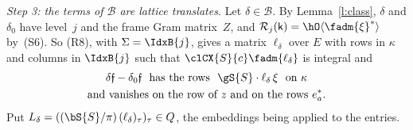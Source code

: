 \documentclass[11pt,a4paper]{article}
\makeatletter
\newcommand{\m}[1]{\mbox{$#1$}}        %
\theoremstyle{plainx}
\theoremstyle{uprightx}
\renewenvironment{proof}[1][Proof]{\par\pushQED{\qed}\normalfont\topsep0pt\partopsep0pt
  \trivlist\item[\hskip\labelsep\itshape #1.]\ignorespaces}{\popQED\endtrivlist\@endpefalse}
\renewcommand{\m}[1]{$#1$}
\newcommand{\bb}{\bS{S}}
\newcommand{\gq}{\gS{S}}
\newcommand{\inp}[1]{\textup{(#1)}}
\makeatother
\begin{document}
\begin{proof}[Proof of Theorem A\,(a)]
\emph{Step 3: the terms of $\mathcal B$ are lattice translates.} Let \m{\delta\in\mathcal B}. By
Lemma~\ref{l:class}, $\delta$ and $\delta_0$ have level~$j$ and the frame Gram matrix~$Z$, and
\m{\mathcal R_j(\mathsf k)=\hO\langle\fadm{\xi}^*\rangle} by~\inp{S6}. So \inp{R8}, with \m{\Sigma=\IdxB{j}}, gives a
matrix \m{\ell_\delta} over $E$ with rows in $\kappa$ and columns in \m{\IdxB{j}} such that
\m{\clCX{S}{c}\fadm{\ell_\delta}} is integral and
\begin{equation}\label{e:A3}
\begin{gathered}\delta\mathfrak f-\delta_0\mathfrak f\ \text{ has the rows }\ \gq\cdot\ell_\delta\,\xi\ \text{ on }\kappa\\
\text{and vanishes on the row of }z\text{ and on the rows }e^*_a.\end{gathered}
\end{equation}
Put \m{L_\delta=((\bb/\pi)\,(\ell_\delta)_\tau)_\tau\in Q}, the embeddings being applied to the entries.


\end{proof}
\end{document}
